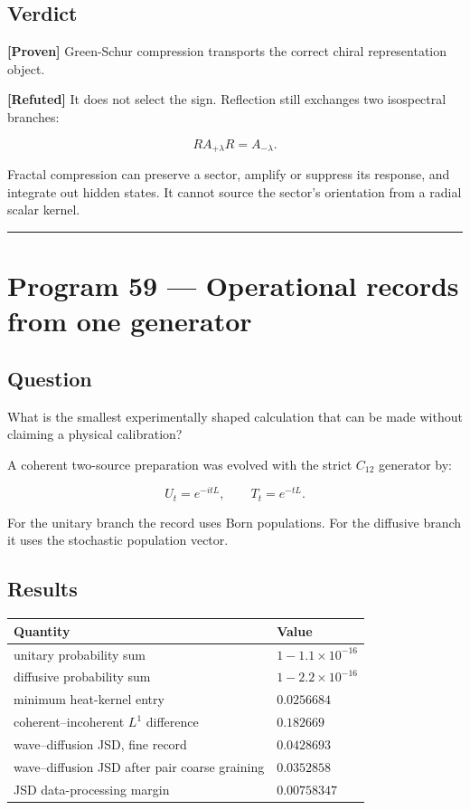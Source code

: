 \documentclass[11pt,a4paper,openany]{report}
\newcommand{\statusProven}{\textcolor{fingreen}{[Proven]}}
\newcommand{\statusRefuted}{\textcolor{finred}{[Refuted]}}
\begin{document}
\section{Verdict}

\textbf{\statusProven{}} Green-Schur compression transports the correct chiral representation object.

\textbf{\statusRefuted{}} It does not select the sign. Reflection still exchanges two isospectral branches:

\[
R A_{+\lambda}R=A_{-\lambda}.
\]

Fractal compression can preserve a sector, amplify or suppress its response, and integrate out hidden states. It cannot source the sector’s orientation from a radial scalar kernel.

\par\medskip\hrule\medskip

\chapter{Program 59 — Operational records from one generator}

\section{Question}

What is the smallest experimentally shaped calculation that can be made without claiming a physical calibration?

A coherent two-source preparation was evolved with the strict \(C_{12}\) generator by:

\[
U_t=e^{-itL},
\qquad
T_t=e^{-tL}.
\]

For the unitary branch the record uses Born populations. For the diffusive branch it uses the stochastic population vector.

\section{Results}

\begin{center}
\begingroup\small
\setlength{\tabcolsep}{3.5pt}
\renewcommand{\arraystretch}{1.16}
\begin{longtable}{@{}p{}p{}@{}}
\toprule
\textbf{Quantity} & \textbf{Value} \\
\midrule
\endhead
unitary probability sum & \(1-1.1\times10^{-16}\) \\
diffusive probability sum & \(1-2.2\times10^{-16}\) \\
minimum heat-kernel entry & \(0.0256684\) \\
coherent–incoherent \(L^1\) difference & \(0.182669\) \\
wave–diffusion JSD, fine record & \(0.0428693\) \\
wave–diffusion JSD after pair coarse graining & \(0.0352858\) \\
JSD data-processing margin & \(0.00758347\) \\
\bottomrule
\end{longtable}
\endgroup
\end{center}
\end{document}
